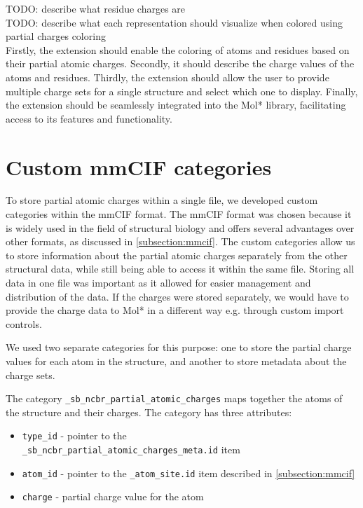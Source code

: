 \documentclass[
  digital,     %
  oneside,     %
  nosansbold,  %
  nocolorbold, %
  lof,         %
  lot,         %
]{fithesis4}
\begin{document}
TODO: describe what residue charges are \\
TODO: describe what each representation should visualize when colored using partial charges coloring \\

Firstly, the extension should enable the coloring of atoms and residues based on their partial atomic charges. Secondly, it should describe the charge values of the atoms and residues. Thirdly, the extension should allow the user to provide multiple charge sets for a single structure and select which one to display. Finally, the extension should be seamlessly integrated into the Mol* library, facilitating access to its features and functionality.

\section{Custom mmCIF categories}
\label{section:custom_mmcif_categories}

To store partial atomic charges within a single file, we developed custom categories within the mmCIF format. The mmCIF format was chosen because it is widely used in the field of structural biology and offers several advantages over other formats, as discussed in \ref{subsection:mmcif}. The custom categories allow us to store information about the partial atomic charges separately from the other structural data, while still being able to access it within the same file. Storing all data in one file was important as it allowed for easier management and distribution of the data. If the charges were stored separately, we would have to provide the charge data to Mol* in a different way e.g. through custom import controls.


We used two separate categories for this purpose: one to store the partial charge values for each atom in the structure, and another to store metadata about the charge sets.

The category \texttt{\_sb\_ncbr\_partial\_atomic\_charges} maps together the atoms of the structure and their charges. The category has three attributes:

\begin{itemize}
  \item \texttt{type\_id} - pointer to the \\ \texttt{\_sb\_ncbr\_partial\_atomic\_charges\_meta.id} item
  \item \texttt{atom\_id} - pointer to the \texttt{\_atom\_site.id} item described in \ref{subsection:mmcif}
  \item \texttt{charge} - partial charge value for the atom
\end{itemize}
\end{document}
